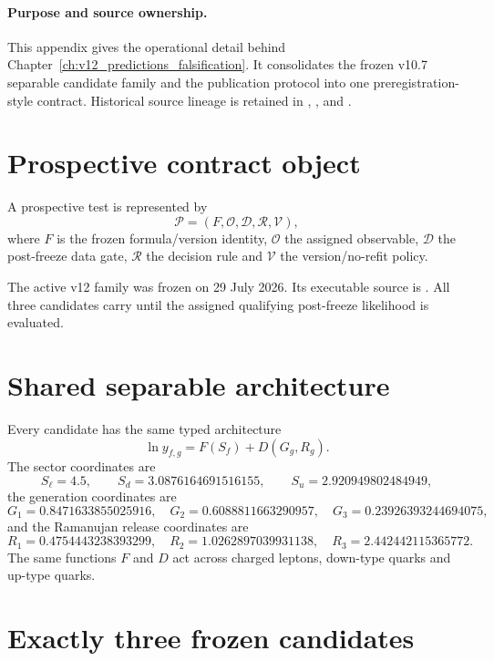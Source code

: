 \paragraph{Purpose and source ownership.}
This appendix gives the operational detail behind
Chapter~\ref{ch:v12_predictions_falsification}.  It consolidates the frozen
v10.7 separable candidate family and the publication protocol into one
preregistration-style contract.  Historical source lineage is retained in
,
, and
.

\section{Prospective contract object}

A prospective test is represented by
\[
\boxed{
\mathcal P=(F,\mathcal O,\mathcal D,\mathcal R,\mathcal V),
}
\]
where \(F\) is the frozen formula/version identity, \(\mathcal O\) the assigned
observable, \(\mathcal D\) the post-freeze data gate, \(\mathcal R\) the decision
rule and \(\mathcal V\) the version/no-refit policy.

The active v12 family was frozen on 29 July 2026.  Its executable source is
.
All three candidates carry
until the assigned qualifying post-freeze likelihood is evaluated.

\section{Shared separable architecture}

Every candidate has the same typed architecture
\[
\boxed{
\ln y_{f,g}=F(S_f)+D(G_g,R_g).
}
\]
The sector coordinates are
\[
S_\ell=4.5,\qquad
S_d=3.0876164691516155,\qquad
S_u=2.920949802484949,
\]
the generation coordinates are
\[
G_1=0.8471633855025916,\quad
G_2=0.6088811663290957,\quad
G_3=0.23926393244694075,
\]
and the Ramanujan release coordinates are
\[
R_1=0.4754443238393299,\quad
R_2=1.0262897039931138,\quad
R_3=2.442442115365772.
\]
The same functions \(F\) and \(D\) act across charged leptons, down-type quarks
and up-type quarks.

\section{Exactly three frozen candidates}

